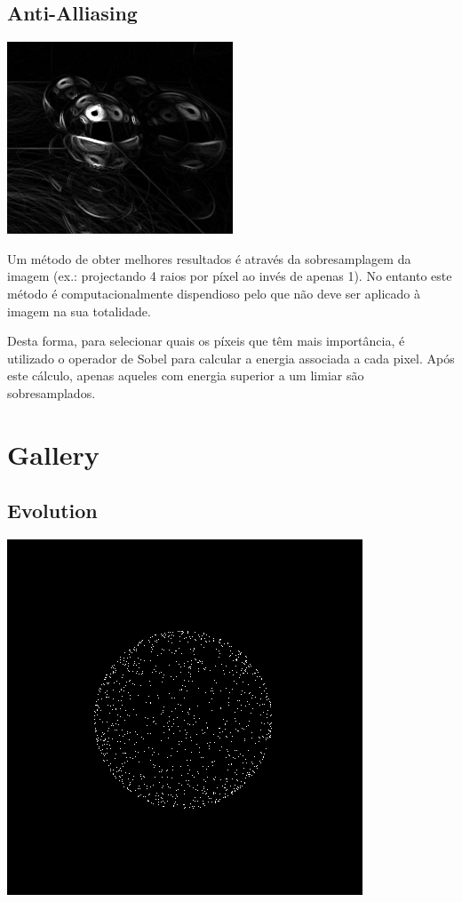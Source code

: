 \documentclass[a4paper]{article}
\begin{document}
\subsection{Anti-Alliasing}
\begin{center}
	\includegraphics[scale=0.50]{images/sobel.png}
	\label{fig:sobel}
\end{center}

\indent Um método de obter melhores resultados é através da sobresamplagem da imagem (ex.: projectando
4 raios por píxel ao invés de apenas 1). No entanto este método é computacionalmente dispendioso pelo que não
deve ser aplicado à imagem na sua totalidade.

\indent Desta forma, para selecionar quais os píxeis que têm mais importância, é utilizado o operador de Sobel
para calcular a energia associada a cada pixel. Após este cálculo, apenas aqueles com energia superior a um limiar
são sobresamplados.

\cleardoublepage
\section{Gallery}
\subsection{Evolution}
\begin{center}
	\includegraphics[scale=1.00]{images/gallery/photon_projection.png}
	\label{fig:photon_projection}
\end{center}
\end{document}
